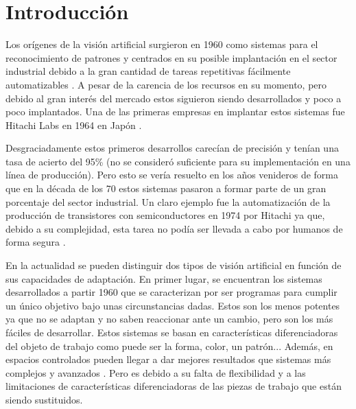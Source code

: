 \chapter{Introducción}
\label{chap:Introducción}


Los orígenes de la visión artificial surgieron en 1960 como sistemas para el reconocimiento de patrones y centrados en su posible implantación en el sector industrial debido a la gran cantidad de tareas repetitivas fácilmente automatizables \citep{50years}. A pesar de la carencia de los recursos en su momento, pero debido al gran interés del mercado estos siguieron siendo desarrollados y poco a poco implantados. Una de las primeras empresas en implantar estos sistemas fue Hitachi Labs en 1964 en Japón \cite{50years}.

Desgraciadamente estos primeros desarrollos carecían de precisión y tenían una tasa de acierto del 95\% (no se consideró suficiente para su implementación en una línea de producción). Pero esto se vería resuelto en los años venideros de forma que en la década de los 70 estos sistemas pasaron a formar parte de un gran porcentaje del sector industrial. Un claro ejemplo fue la automatización de la producción de transistores con semiconductores en 1974 por Hitachi ya que, debido a su complejidad, esta tarea no podía ser llevada a cabo por humanos de forma segura \cite{hitachi}.

En la actualidad se pueden distinguir dos tipos de visión artificial en función de sus capacidades de adaptación. En primer lugar, se encuentran los sistemas  desarrollados a partir 1960 que se caracterizan por ser programas para cumplir un único objetivo bajo unas circunstancias dadas. Estos son los menos potentes ya que no se adaptan y no saben reaccionar ante un cambio, pero son los más fáciles de desarrollar. Estos sistemas se basan en características diferenciadoras del objeto de trabajo como puede ser la forma, color, un patrón... Además, en espacios controlados pueden llegar a dar mejores resultados que sistemas más complejos y avanzados \cite{ABB}. Pero es debido a su falta de flexibilidad y a las limitaciones de características diferenciadoras de las piezas de trabajo que están siendo sustituidos.

